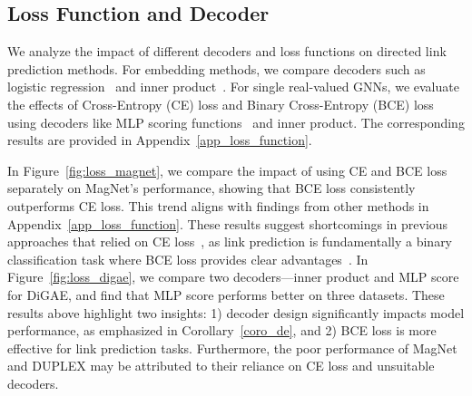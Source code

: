 \subsection{Loss Function and Decoder}
We analyze the impact of different decoders and loss functions on directed link prediction methods. For embedding methods, we compare decoders such as logistic regression~\cite{eltra} and inner product~\cite{strap}. For single real-valued GNNs, we evaluate the effects of Cross-Entropy (CE) loss and Binary Cross-Entropy (BCE) loss using decoders like MLP scoring functions~\cite{magnet} and inner product. The corresponding results are provided in Appendix~\ref{app_loss_function}.

In Figure~\ref{fig:loss_magnet}, we compare the impact of using CE and BCE loss separately on MagNet's performance, showing that BCE loss consistently outperforms CE loss. This trend aligns with findings from other methods in Appendix~\ref{app_loss_function}. These results suggest shortcomings in previous approaches that relied on CE loss~\cite{dpyg}, as link prediction is fundamentally a binary classification task where BCE loss provides clear advantages~\cite{li2023evaluating}. %
In Figure~\ref{fig:loss_digae}, we compare two decoders—inner product and MLP score for DiGAE, and find that MLP score performs better on three datasets. These results above highlight two insights: 1) decoder design significantly impacts model performance, as emphasized in Corollary~\ref{coro_de}, and 2) BCE loss is more effective for link prediction tasks. Furthermore, the poor performance of MagNet and DUPLEX may be attributed to their reliance on CE loss and unsuitable decoders.






